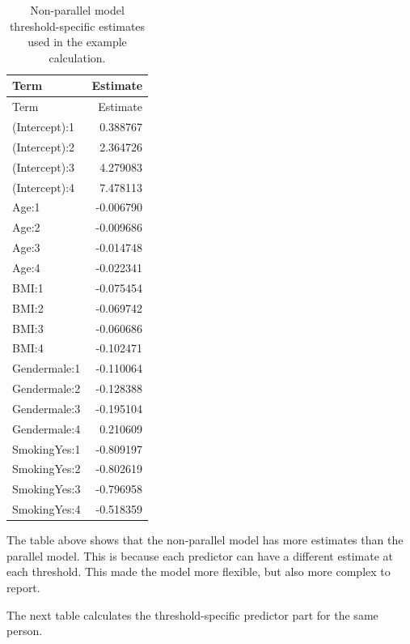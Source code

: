 \documentclass{article}
\begin{document}
\begin{longtable}[]{@{}lr@{}}
\caption{Non-parallel model threshold-specific estimates used in the
example calculation.}\tabularnewline
\toprule\noalign{}
Term & Estimate \\
\midrule\noalign{}
\endfirsthead
\toprule\noalign{}
Term & Estimate \\
\midrule\noalign{}
\endhead
\bottomrule\noalign{}
\endlastfoot
(Intercept):1 & 0.388767 \\
(Intercept):2 & 2.364726 \\
(Intercept):3 & 4.279083 \\
(Intercept):4 & 7.478113 \\
Age:1 & -0.006790 \\
Age:2 & -0.009686 \\
Age:3 & -0.014748 \\
Age:4 & -0.022341 \\
BMI:1 & -0.075454 \\
BMI:2 & -0.069742 \\
BMI:3 & -0.060686 \\
BMI:4 & -0.102471 \\
Gendermale:1 & -0.110064 \\
Gendermale:2 & -0.128388 \\
Gendermale:3 & -0.195104 \\
Gendermale:4 & 0.210609 \\
SmokingYes:1 & -0.809197 \\
SmokingYes:2 & -0.802619 \\
SmokingYes:3 & -0.796958 \\
SmokingYes:4 & -0.518359 \\
\end{longtable}

The table above shows that the non-parallel model has more estimates
than the parallel model. This is because each predictor can have a
different estimate at each threshold. This made the model more flexible,
but also more complex to report.

The next table calculates the threshold-specific predictor part for the
same person.
\end{document}
